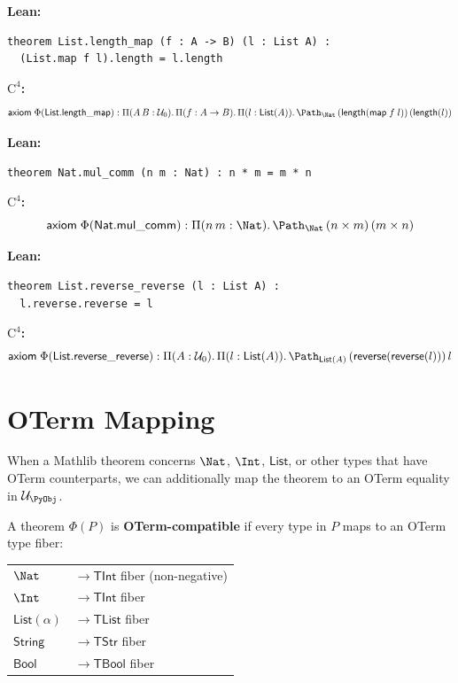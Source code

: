 \begin{example}
\textbf{Lean:}
\begin{lstlisting}[language={}]
theorem List.length_map (f : A -> B) (l : List A) :
  (List.map f l).length = l.length
\end{lstlisting}
\textbf{$\mathrm{C}^4$:}
\[
  \mathsf{axiom}\;\Phi(\mathsf{List.length\_map}) :
  \Pi(A\, B : \mathcal{U}_0).\,
  \Pi(f : A \to B).\, \Pi(l : \mathsf{List}(A)).\,
  \Path_\Nat\, (\mathsf{length}(\mathsf{map}\;f\;l))\,
    (\mathsf{length}(l))
\]
\end{example}

\begin{example}
\textbf{Lean:}
\begin{lstlisting}[language={}]
theorem Nat.mul_comm (n m : Nat) : n * m = m * n
\end{lstlisting}
\textbf{$\mathrm{C}^4$:}
\[
  \mathsf{axiom}\;\Phi(\mathsf{Nat.mul\_comm}) :
  \Pi(n\, m : \Nat).\, \Path_\Nat\, (n \times m)\, (m \times n)
\]
\end{example}

\begin{example}
\textbf{Lean:}
\begin{lstlisting}[language={}]
theorem List.reverse_reverse (l : List A) :
  l.reverse.reverse = l
\end{lstlisting}
\textbf{$\mathrm{C}^4$:}
\[
  \mathsf{axiom}\;\Phi(\mathsf{List.reverse\_reverse}) :
  \Pi(A : \mathcal{U}_0).\, \Pi(l : \mathsf{List}(A)).\,
  \Path_{\mathsf{List}(A)}\,
    (\mathsf{reverse}(\mathsf{reverse}(l)))\, l
\]
\end{example}


\section{OTerm Mapping}
\label{sec:oterm-mapping}

When a Mathlib theorem concerns $\Nat$, $\Int$, $\mathsf{List}$, or other
types that have OTerm counterparts, we can additionally map the theorem
to an OTerm equality in $\mathcal{U}_\PyObj$.

\begin{definition}
A theorem $\Phi(P)$ is \textbf{OTerm-compatible} if every type in $P$
maps to an OTerm type fiber:
\begin{center}
\begin{tabular}{ll}
$\Nat$ & $\to \mathsf{TInt}$ fiber (non-negative) \\
$\Int$ & $\to \mathsf{TInt}$ fiber \\
$\mathsf{List}(\alpha)$ & $\to \mathsf{TList}$ fiber \\
$\mathsf{String}$ & $\to \mathsf{TStr}$ fiber \\
$\mathsf{Bool}$ & $\to \mathsf{TBool}$ fiber \\
\end{tabular}
\end{center}
\end{definition}

